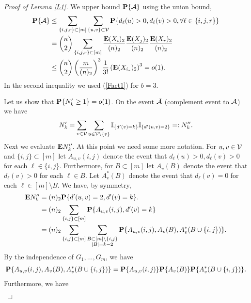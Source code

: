 \documentclass[11pt, a4paper]{article}
\newcommand{\E}{{\bf{E}}}
\newcommand{\PP}{{\bf{P}}}
\begin{document}
\begin{proof}[Proof of Lemma \ref{L1}]
We upper bound $\PP\{{\cal A}\}$ using 
the union bound,
\begin{align*}
\PP\{{\cal A}\}
&
\le 
\sum_{\{i,j,r\}\subset [m]}
\sum_{\{u,v\}\subset {\cal V}}
\PP\{d_\ell(u)>0, d_\ell(v)>0, \forall \ell\in\{i,j,r\}\}
\\
&
=
\binom{n}{2}
\sum_{\{i,j,r\}\subset [m]}
\frac{\E(X_i)_2}{(n)_2}
\frac{\E(X_j)_2}{(n)_2}
\frac{\E(X_r)_2}{(n)_2}
\\
&
\le
\binom{n}{2}
\left(\frac{m}{(n)_2}\right)^3
\frac{1}{3!}
\left(\E (X_{i_*})_2\right)^3
=o(1).
\end{align*}
In the second inequality we used (\ref{Fact1}) for $b=3$.


Let us show that $\PP\{N'_k\ge 1\}=o(1)$.
On the event ${\bar {\cal A}}$ (complement event to 
${\cal A}$) we have
\begin{align*}
N'_k
=
\sum_{v\in {\cal V}}\sum_{u\in{\cal V}\setminus\{v\}}
{\mathbb  I}_{\{d'(v)= k\}} 
{\mathbb  I}_{\{d'(u,v)=2\}}=:N''_k.
\end{align*}
 Next we evaluate $\E N''_k$. At this point we need  some more notation. 
 For 
 $u,v\in{\cal V}$ and $\{i,j\}\subset [m]$ let $A_{u,v}(i,j)$ denote the event that $d_\ell(u)>0,d_\ell(v)>0$ for each 
 $\ell\in\{i,j\}$. Furthermore, for $B\subset [m]$
 let $A_v(B)$ denote the event that 
 $d_\ell(v)>0$ for 
 each $\ell\in B$. Let $A^*_v(B)$ denote the event that $d_\ell(v)=0$ for each $\ell\in[m]\setminus B$.
 We have, by  symmetry,
\begin{align}
\nonumber
\E N''_k
&
=
(n)_2\PP\{d'(u,v)=2, d'(v)=k\}.
\\
\nonumber
&
=
(n)_2
\sum_{\{i,j\}\subset[m]}
\PP\{A_{u,v}(i,j),  d'(v)=k\}
\\
\label{2026-01-14}
&
=
(n)_2
\sum_{\{i,j\}\subset[m]}
\sum_{\substack{B\subset [m]\setminus\{i,j\}\\
|B|=k-2}}
\PP\{A_{u,v}(i,j), A_v(B), 
A^*_v(B\cup\{i,j\})\}.
\end{align}
By the independence of $G_1,\dots, G_m$, we have
\begin{align*}
\PP\{A_{u,v}(i,j), A_v(B), 
A^*_v(B\cup\{i,j\})\}
=
\PP\{A_{u,v}(i,j)\}
\PP\{A_v(B)\}
\PP\{A^*_v(B\cup\{i,j\})\}.
\end{align*}
Furthermore, we have
\begin{align*}

\end{align*}
\end{proof}
\end{document}
